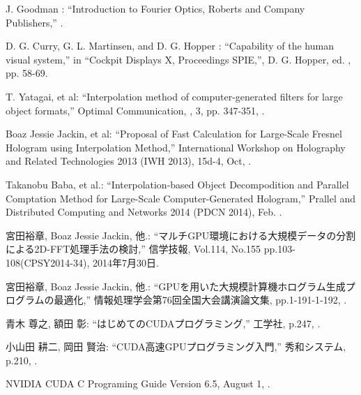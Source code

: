 {\small J. Goodman : %
\newblock ``Introduction to Fourier Optics, Roberts and Company Publishers,''
\newblock 
\newblock 
{}.}

{\small D. G. Curry, G. L. Martinsen, and D. G. Hopper : %
\newblock ``Capability of the human visual system,''
\newblock in ``Cockpit Displays X, Proceedings SPIE,'',
\newblock D. G. Hopper, ed. 
,
\newblock pp. 58-69.}

{\small T. Yatagai, et al: %
\newblock ``Interpolation method of computer-generated filters for large object formats,''
\newblock Optimal Communication,
, 3,
\newblock pp. 347-351,
.}

{\small Boaz Jessie Jackin, et al: %
\newblock ``Proposal of Fast Calculation for Large-Scale Fresnel Hologram using Interpolation Method,''
\newblock International Workshop on Holography and Related Technologies 2013 (IWH 2013),
\newblock 15d-4,
\newblock Oct,
.}

{\small Takanobu Baba, et al.:      %
\newblock ``Interpolation-based Object Decompodition and Parallel Comptation Method for Large-Scale Computer-Generated Hologram,''
\newblock Prallel and Distributed Computing and Networks 2014 (PDCN 2014),
\newblock Feb.
. }

{\small 宮田裕章, Boaz Jessie Jackin, 他.:      %
\newblock ``マルチGPU環境における大規模データの分割による2D-FFT処理手法の検討,''
\newblock 信学技報,
\newblock Vol.114,
\newblock No.155
\newblock pp.103-108(CPSY2014-34), 
\newblock 2014年7月30日. }

{\small 宮田裕章, Boaz Jessie Jackin, 他.:      %
\newblock ``GPUを用いた大規模計算機ホログラム生成プログラムの最適化,''
\newblock 情報処理学会第76回全国大会講演論文集,
\newblock pp.1-191-1-192, 
. }

{\small 青木 尊之, 額田 彰: %
\newblock ``はじめてのCUDAプログラミング,''
\newblock 工学社,
\newblock p.247,
.}

{\small 小山田 耕二, 岡田 賢治: %
\newblock ``CUDA高速GPUプログラミング入門,''
\newblock 秀和システム,
\newblock p.210,
.}

{\small NVIDIA CUDA C Programing Guide Version 6.5, %
\newblock August 1,             %
.}


